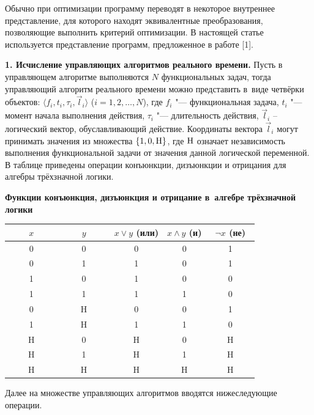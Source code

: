 Обычно при оптимизации программу переводят в некоторое внутреннее
представление,  для которого находят эквивалентные преобразования,
позволяющие выполнить критерий оптимизации. В настоящей статье используется
представление программ,  предложенное в работе [1].

\textbf{1. Исчисление управляющих алгоритмов реального времени.}
Пусть в управляющем алгоритме выполняются $N$ функциональных задач,
тогда управляющий алгоритм реального времени можно представить
в~виде четвёрки объектов:
$\langle f_i , t_i , \tau _i , \vec l_i \rangle $  ($i=1, 2, \dots, N$),
где $f_i $ "--- функциональная задача,
$t_i $ "--- момент начала выполнения действия,
$\tau _i $ "--- длительность действия,
$\vec l_i $ -- логический вектор,  обуславливающий действие.
Координаты вектора
$\vec l_i $ могут принимать значения из множества $\{1, 0, \rm H\}$,
где $\rm  H$ означает независимость выполнения функциональной задачи от значения
данной логической переменной.
В таблице приведены операции конъюнкции,
дизъюнкции и отрицания для алгебры трёхзначной логики.

\begin{table}[htbp]
\centering
\begin{minipage}{.7\textwidth}
\centering
\textbf{Функции конъюнкция,  дизъюнкция и отрица\-ние в~алгебре трёхзначной логики}\vspace{-.1mm}

\begin{tabular}{c|c|c|c|c}
\hline
~~~~$x$~~~~&
~~~~$y$~~~~&
$x \vee y $ (или)&
$x \wedge y$ (и)&
~$\neg x$ (не)~ \\
\hline
0&
0&
0&
0&
1 \\
\hline
0&
1&
1&
0&
1 \\
\hline
1&
0&
1&
0&
0 \\
\hline
1&
1&
1&
1&
0 \\
\hline
0&
H&
0&
0&
1 \\
\hline
1&
H&
1&
1&
0 \\
\hline
H&
0&
H&
0&
H \\
\hline
H&
1&
H&
1&
H \\
\hline
H&
H&
H&
H&
H \\
\hline
\end{tabular}
\end{minipage}
\end{table}


Далее  на множестве управляющих алгоритмов вводятся нижеследующие операции.

